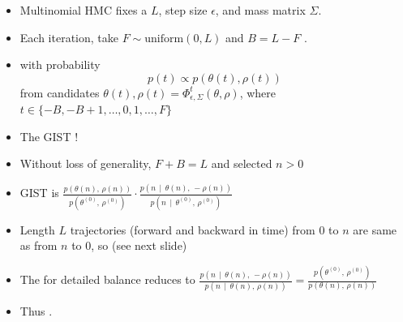 \documentclass[10pt]{report}
\newcommand{\pos}[2]{#1^{(#2)}}
\begin{document}
\begin{itemize}
\item Multinomial HMC fixes a  $L$, step size
  $\epsilon$, and mass matrix $\Sigma$.
\item Each iteration, take $F \sim \textrm{uniform}(0, L)$  and $B = L - F$ .
  \item {} with probability
    $$p(t) \propto p(\theta(t), \rho(t))$$ from
    candidates  $\theta(t), \rho(t) = \Phi^t_{\epsilon,
      \Sigma}(\theta, \rho)$, where $t \in \{ -B, -B + 1, \ldots, 0, 1, \ldots, F \}$
\item The GIST !
\end{itemize}

\begin{itemize}
\item Without loss of generality,  $F + B = L$ and selected $n > 0$
\item GIST  is
  $\frac{p(\theta(n),\,   \rho(n))}
        {p(\pos{\theta}{0},\, \pos{\rho}{0})}
   \cdot
   \frac{p(n \, \mid \, \theta(n),\, -\rho(n))}
        {p(n \, \mid \, \pos{\theta}{0},\, \pos{\rho}{0})}$
      \item Length $L$ trajectories (forward and backward in time) from 0 to $n$ are same
        as from $n$ to 0, so  (see next slide)
\item The  for detailed balance reduces to
$\frac{p(n \, \mid \, \theta(n),\, -\rho(n))}
      {p(n \, \mid \, \theta(n),\, \rho(n))}
      = \frac{p(\pos{\theta}{0},\, \pos{\rho}{0})}
      {p(\theta(n),\, \rho(n))}$
\item Thus .
\end{itemize}
\end{document}
